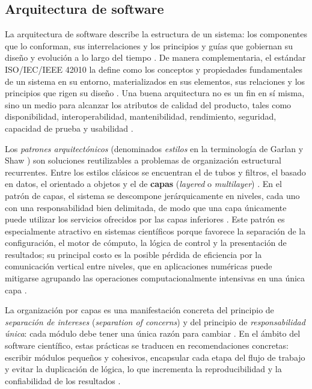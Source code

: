 \documentclass[12pt,letterpaper]{article}
\begin{document}
\subsection{Arquitectura de software}
La arquitectura de software describe la estructura de un sistema: los componentes que lo conforman, sus interrelaciones y los principios y guías que gobiernan su diseño y evolución a lo largo del tiempo \cite{garlan1994introduction}. De manera complementaria, el estándar ISO/IEC/IEEE 42010 la define como los conceptos y propiedades fundamentales de un sistema en su entorno, materializados en sus elementos, sus relaciones y los principios que rigen su diseño \cite{isoiec42010}. Una buena arquitectura no es un fin en sí misma, sino un medio para alcanzar los atributos de calidad del producto, tales como disponibilidad, interoperabilidad,
mantenibilidad, rendimiento, seguridad, capacidad de prueba y usabilidad \cite{bass2021sia}.

Los \emph{patrones arquitectónicos} (denominados \emph{estilos} en la terminología de Garlan y Shaw \cite{garlan1994introduction}) son soluciones reutilizables a problemas de organización estructural recurrentes. Entre los estilos clásicos se encuentran el de tubos y filtros, el basado en datos, el orientado a objetos y el de \textbf{capas} (\emph{layered} o \emph{multilayer}) \cite{buschmann1996posa}. En el patrón de capas, el sistema se descompone jerárquicamente en niveles, cada uno con una responsabilidad bien delimitada, de modo que una capa únicamente puede utilizar los servicios ofrecidos por las capas inferiores \cite{buschmann1996posa}. Este patrón es especialmente atractivo en sistemas científicos porque favorece la separación de la configuración, el motor de cómputo, la lógica de control y la presentación de resultados; su principal costo es la posible pérdida de eficiencia por la comunicación vertical entre niveles, que en aplicaciones numéricas puede mitigarse agrupando las operaciones computacionalmente intensivas en una única capa \cite{buschmann1996posa}.

La organización por capas es una manifestación concreta del principio de \emph{separación de intereses} (\emph{separation of concerns}) y del principio de \emph{responsabilidad única}: cada módulo debe tener una única razón para cambiar \cite{martin2003agile}. En el ámbito del software científico, estas prácticas se traducen en recomendaciones concretas: escribir módulos pequeños y cohesivos, encapsular cada etapa del flujo de trabajo y evitar la duplicación de lógica, lo que incrementa la reproducibilidad y la confiabilidad de los resultados \cite{wilson2014best}.
\end{document}

